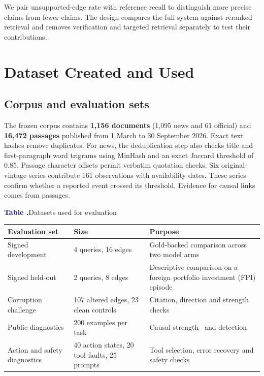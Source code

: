 \documentclass[11pt,a4paper]{article}
\newcommand{\tablehead}[1]{\textbf{#1}}
\newcounter{reporttable}
\newenvironment{reporttable}[1]{%
  \par\addvspace{14pt}\noindent\begin{minipage}{\linewidth}
  \refstepcounter{reporttable}%
  {\rmfamily\fontsize{10.5}{13.5}\selectfont
    \textcolor{Navy}{\bfseries Table \thereporttable.}\enspace #1}\par\vspace{8pt}%
  \rmfamily\fontsize{10.2}{13.5}\selectfont
  \renewcommand{\arraystretch}{1.26}%
  \setlength{\tabcolsep}{9pt}%
  \arrayrulecolor{Rule}%
}{%
  \end{minipage}\par\addvspace{13pt}%
}
\begin{document}
We pair unsupported-edge rate with reference recall to distinguish
more precise claims from fewer claims. The design compares the full
system against reranked retrieval and removes verification and targeted
retrieval separately to test their contributions.

\section{Dataset Created and Used}\label{dataset-created-and-used}

\subsection{Corpus and evaluation
sets}\label{corpus-and-evaluation-sets}

The frozen corpus contains \textbf{1,156 documents} (1,095 news and 61
official) and \textbf{16,472 passages} published from 1 March to 30
September 2026. Exact text hashes remove duplicates. For news, the
deduplication step also checks title and first-paragraph word trigrams
using MinHash and an exact Jaccard threshold of 0.85. Passage character
offsets permit verbatim quotation checks. Six original-vintage series
contribute 161 observations with availability dates. These series
confirm whether a reported event crossed its threshold. Evidence for
causal links comes from passages.

\begin{reporttable}{Datasets used for evaluation}
\begin{tabularx}{\linewidth}{@{}L{0.82}L{0.98}L{1.20}@{}}
\toprule
\tablehead{Evaluation set} & \tablehead{Size} & \tablehead{Purpose} \\
\midrule
Signed development & 4 queries, 16 edges & Gold-backed comparison across two model arms \\
Signed held-out & 2 queries, 8 edges & Descriptive comparison on a foreign portfolio investment (FPI) episode \\
Corruption challenge & 107 altered edges, 23 clean controls & Citation, direction and strength checks \\
Public diagnostics & 200 examples per task & Causal strength~\cite{yu2019} and detection~\cite{mariko2020} \\
Action and safety diagnostics & 40 action states, 20 tool faults, 25 prompts & Tool selection, error recovery and safety checks \\
\bottomrule
\end{tabularx}
\end{reporttable}
\end{document}
